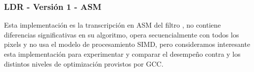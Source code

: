 \subsubsection{LDR - Versión 1 - ASM}
\label{sec:LDRASM1}
Esta implementación es la transcripción en ASM del filtro \textbf{}, no contiene diferencias significativas en su algoritmo, opera secuencialmente con todos los pixels y no usa el modelo de procesamiento SIMD, pero consideramos interesante esta implementación para experimentar y comparar el desempeño contra \textbf{} y los distintos niveles de optimización provistos por GCC.